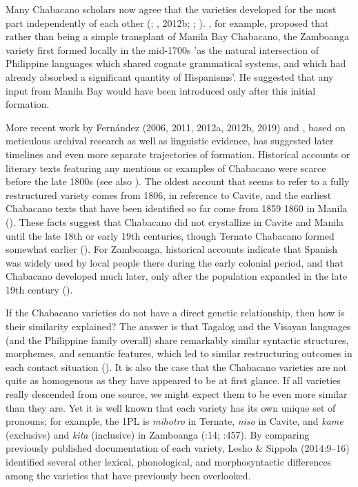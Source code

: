 Many Chabacano scholars now agree that the varieties developed for the most part independently of each other (\citealt{Lipski1992}; \citealt{Fernández2011,2012a2011}, 2012b; \citealt{FernándezSippola2017}; \citealt{SippolaLesho2020}). \citet[12]{Lipski1992}, for example, proposed that rather than being a simple transplant of Manila Bay Chabacano, the Zamboanga variety first formed locally in the mid-1700s 'as the natural intersection of Philippine languages which shared cognate grammatical systems, and which had already absorbed a significant quantity of Hispanisms'. He suggested that any input from Manila Bay would have been introduced only after this initial formation.

More recent work by Fernández (2006, 2011,  2012a, 2012b, 2019) and \citet{FernándezSippola2017}, based on meticulous archival research as well as linguistic evidence, has suggested later timelines and even more separate trajectories of formation. Historical accounts or literary texts featuring any mentions or examples of Chabacano were scarce before the late 1800s (see also \citealt{Lipski2013}). The oldest account that seems to refer to a fully restructured variety comes from 1806, in reference to Cavite, and the earliest Chabacano texts that have been identified so far come from 1859 1860 in Manila (\citealt{FernándezSippola2017}). These facts suggest that Chabacano did not crystallize in Cavite and Manila until the late 18th or early 19th centuries, though Ternate Chabacano formed somewhat earlier (\citealt{FernándezSippola2017}). For Zamboanga, historical accounts indicate that Spanish was widely used by local people there during the early colonial period, and that Chabacano developed much later, only after the population expanded in the late 19th century (\citealt{Fernández2006,2012b2006}). 

If the Chabacano varieties do not have a direct genetic relationship, then how is their similarity explained? The answer is that Tagalog and the Visayan languages (and the Philippine family overall) share remarkably similar syntactic structures, morphemes, and semantic features, which led to similar restructuring outcomes in each contact situation (\citealt{SippolaLesho2020}). It is also the case that the Chabacano varieties are not quite as homogenous as they have appeared to be at first glance. If all varieties really descended from one source, we might expect them to be even more similar than they are. Yet it is well known that each variety has its own unique set of pronouns; for example, the 1PL is \textit{mihotro} in Ternate, \textit{niso} in Cavite, and \textit{kame} (exclusive) and \textit{kita} (inclusive) in Zamboanga (\citealt{LeshoSippola2014}:14; \citealt{Lipski2013}:457). By comparing previously published documentation of each variety, Lesho \& Sippola (2014:9–16) identified several other lexical, phonological, and morphosyntactic differences among the varieties that have previously been overlooked. 

